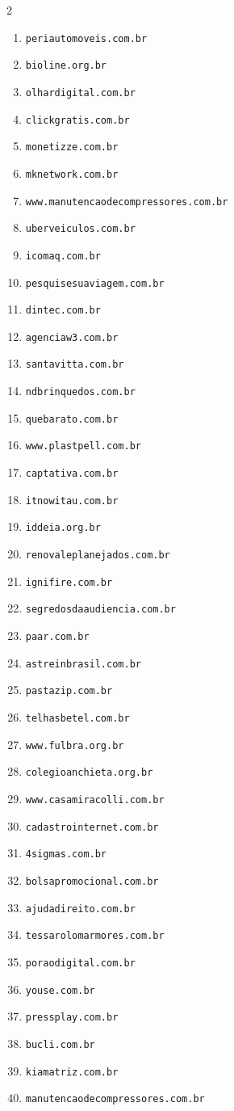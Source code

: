 \begin{multicols}{2}
\begin{enumerate}
    \item \texttt{periautomoveis.com.br}
    \item \texttt{bioline.org.br}
    \item \texttt{olhardigital.com.br}
    \item \texttt{clickgratis.com.br}
    \item \texttt{monetizze.com.br}
    \item \texttt{mknetwork.com.br}
    \item \texttt{www.manutencaodecompressores.com.br}
    \item \texttt{uberveiculos.com.br}
    \item \texttt{icomaq.com.br}
    \item \texttt{pesquisesuaviagem.com.br}
    \item \texttt{dintec.com.br}
    \item \texttt{agenciaw3.com.br}
    \item \texttt{santavitta.com.br}
    \item \texttt{ndbrinquedos.com.br}
    \item \texttt{quebarato.com.br}
    \item \texttt{www.plastpell.com.br}
    \item \texttt{captativa.com.br}
    \item \texttt{itnowitau.com.br}
    \item \texttt{iddeia.org.br}
    \item \texttt{renovaleplanejados.com.br}
    \item \texttt{ignifire.com.br}
    \item \texttt{segredosdaaudiencia.com.br}
    \item \texttt{paar.com.br}
    \item \texttt{astreinbrasil.com.br}
    \item \texttt{pastazip.com.br}
    \item \texttt{telhasbetel.com.br}
    \item \texttt{www.fulbra.org.br}
    \item \texttt{colegioanchieta.org.br}
    \item \texttt{www.casamiracolli.com.br}
    \item \texttt{cadastrointernet.com.br}
    \item \texttt{4sigmas.com.br}
    \item \texttt{bolsapromocional.com.br}
    \item \texttt{ajudadireito.com.br}
    \item \texttt{tessarolomarmores.com.br}
    \item \texttt{poraodigital.com.br}
    \item \texttt{youse.com.br}
    \item \texttt{pressplay.com.br}
    \item \texttt{bucli.com.br}
    \item \texttt{kiamatriz.com.br}
    \item \texttt{manutencaodecompressores.com.br}
\end{enumerate}
\end{multicols}


